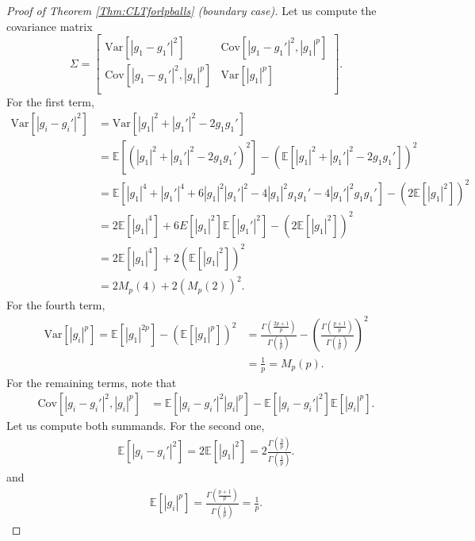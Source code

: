 \documentclass[10pt,a4paper]{amsart}
\def\E{\mathbb{E}}
\def\cov{\text{Cov}}
\def\var{\text{Var}}
\begin{document}
\begin{proof}[Proof of Theorem \ref{Thm:CLTforlpballs} (boundary case)]
Let us compute the covariance matrix 
\[
   \Sigma = 
  \left[ {\begin{array}{cc}
   \var[|g_1 - g_1'|^2] & \cov[|g_1 - g_1'|^2 , |g_1|^p] \\
   \cov[|g_1 - g_1'|^2 , |g_1|^p] &  \var[|g_1|^p] \\
  \end{array} } \right].
\]
For the first term,
\begin{align*}
\var \left[ \left| g_i - g_i' \right|^2   \right] & = \var \left[ | g_1 |^2 + | g_1' |^2
- 2 g_1 g_1'   \right]
 \\
 & = \E \left[ \left( | g_1 |^2 + | g_1' |^2 - 2 g_1 g_1' \right) ^2 \right] -
\left( \E \left[ | g_1 |^2 + | g_1' |^2 - 2 g_1 g_1'   \right] \right)^2
 \\
 & = \E \left[ |g_1|^4 + |g_1'|^4 + 6 |g_1|^2 |g_1'|^2 -4|g_1|^2 g_1g_1' -4|g_1'|^2 g_1g_1'   \right]
 - \left( 2 \E \left[ |g_1|^2  \right] \right)^2
 \\
 & = 2 \E \left[ |g_1|^4 \right] + 6 E\left[ |g_1|^2 \right] \E \left[ |g_1'|^2 \right] - \left( 2 \E \left[ |g_1|^2  \right] \right)^2
 \\
 & = 2 \E \left[ |g_1|^4 \right] + 2 \left( \E \left[ |g_1|^2  \right] \right)^2
 \\
 & = 2 M_p(4) + 2 (M_p(2))^2.
\end{align*}
For the fourth term,
\begin{align*}
\var \left[ \left| g_i\right|^p   \right] = \E \left[  | g_1 |^{2p} \right] -
\left( \E \left[ | g_1 |^p   \right] \right)^2 & = \frac{\Gamma \left( \frac{2p + 1}{p} \right)}{\Gamma \left( \frac{1}{p} \right)} - \left( \frac{\Gamma \left( \frac{p+1}{p} \right)}{\Gamma \left( \frac{1}{p} \right)} \right)^2 
 \\
  & = \frac{1}{p} = M_p(p).
\end{align*}
For the remaining terms, note that
\begin{align*}
\cov[\left| g_i - g_i'\right|^2 , \left| g_i\right|^p ] & = \E [\left| g_i - g_i'\right|^2 \left| g_i\right|^p  ] - \E [\left| g_i - g_i'\right|^2  ] \E [ \left| g_i\right|^p  ].
\end{align*}
Let us compute both summands. For the second one,
\begin{align*}
\E [\left| g_i - g_i'\right|^2] = 2\E [\left| g_1 \right|^2] = 2 \frac{\Gamma \left( \frac{3}{p} \right)}{\Gamma \left( \frac{1}{p} \right)}.
\end{align*}
and
\begin{align*}
\E [\left| g_i \right|^p] = \frac{\Gamma \left( \frac{p+1}{p} \right)}{\Gamma \left( \frac{1}{p} \right)} = \frac{1}{p}.

\end{align*}
\end{proof}
\end{document}
